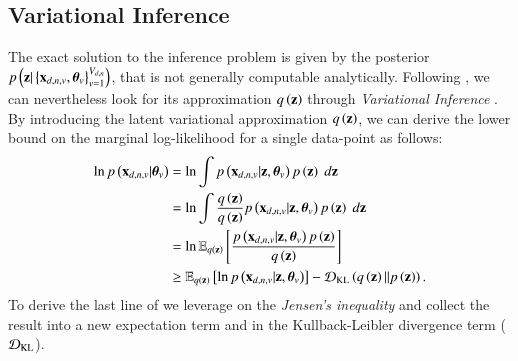 \subsection{Variational Inference}
\label{ssec:derivation}

The exact solution to the inference problem is given by the posterior $\p{\z|\set{\xdnv,\thetab_v}_{v=1}^{V_{d,n}}}$, that is not generally computable analytically.
Following \cite{Antelmi2019}, we can nevertheless look for its approximation $\qz$ through \textit{Variational Inference} \citep{Blei2017}.
By introducing the latent variational approximation $\qz$, we can derive the lower bound on the marginal log-likelihood for a single data-point as follows:
\begin{equation}\label{eq:LB}
\begin{aligned}
\ln \p{\xdnv|\thetab_v} &= \ln \int \p{\xdnv|\z, \thetab_v} \p{\z} \; d\z \\
                        &= \ln \int \frac{\qz}{\qz} \p{\xdnv|\z, \thetab_v} \p{\z} \; d\z \\
                        &= \ln \EE{\qz}{\frac{\p{\xdnv|\z, \thetab_v} \p{\z}}{\qz}} \\
                        &\geq \EE{\qz}{\ln \p{\xdnv|\z, \thetab_v}} - \KL{\qz}{\pz}.
\end{aligned}
\end{equation}
To derive the last line of  we leverage on the \textit{Jensen's inequality} and collect the result into a new expectation term and in the Kullback-Leibler divergence term ($\kl$).

